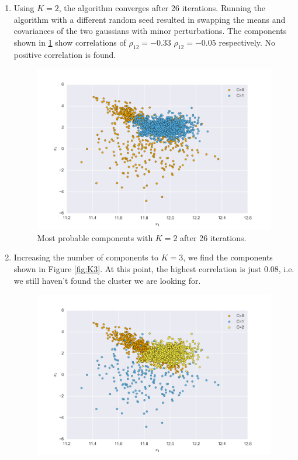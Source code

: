 \documentclass[a4paper]{article}
\begin{document}
\begin{enumerate}
\begin{lstlisting}
    plt.legend()
    plt.xlabel('$x_1$')
    plt.xlabel('$x_2$')
    plt.savefig('EM.png', dpi=300, bbox_layout='tight')
    plt.show()
\end{lstlisting}
\item Using $K=2$, the algorithm converges after 26 iterations. Running the algorithm with a different random seed resulted in swapping the means and covariances of the two gaussians with minor perturbations. The components shown in \ref{fig:K2} show correlations of $\rho_{12}=-0.33$ $\rho_{12}=-0.05$ respectively. No positive correlation is found.
\begin{figure}
\centering
\includegraphics[width=0.8\linewidth]{figures/EM_K2.png}
\caption{Most probable components with $K=2$ after 26 iterations.}
\label{fig:K2}
\end{figure}
\item Increasing the number of components to $K=3$, we find the components shown in Figure \ref{fig:K3}. At this point, the highest correlation is just 0.08, i.e. we still haven't found the cluster we are looking for.
\begin{figure}
\centering
\includegraphics[width=0.8\linewidth]{figures/EM_K3.png}

\end{figure}
\end{enumerate}
\end{document}
